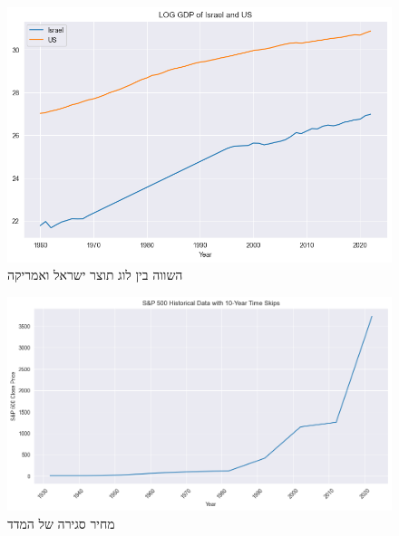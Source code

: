 \documentclass[a4paper,12pt]{article}
\begin{document}
\begin{RTL}
\begin{hebrew}
\begin{figure}[H]
    \centering
    \includegraphics[width=1\linewidth]{LOG - GDP - ISRAEL - US.png}
    \caption{השווה בין לוג תוצר ישראל ואמריקה}
    
\end{figure}
\begin{figure}[H]
    \centering
    \includegraphics[width=\linewidth]{S&P500_graph.png}
    \caption{מחיר סגירה של המדד }
\end{figure}


\end{hebrew}
\end{RTL}
\end{document}
